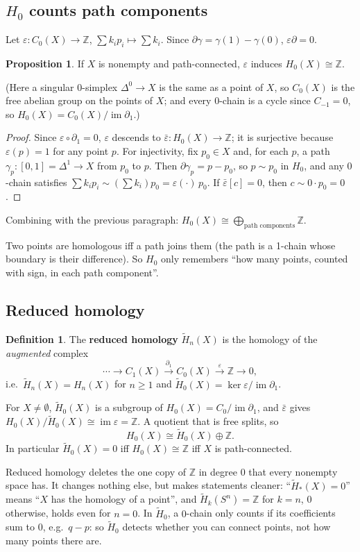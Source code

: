 \documentclass[11pt]{article}
\newcommand{\Z}{\mathbb Z}
\newcommand{\im}{\operatorname{im}}
\newcommand{\Hred}{\tilde H}
\theoremstyle{definition}
\newtheorem{prop}[thm]{Proposition}
\newtheorem{defn}[thm]{Definition}
\begin{document}
\subsection{$H_0$ counts path components}
Let $\varepsilon:C_0(X)\to\Z$, $\sum k_ip_i\mapsto\sum k_i$. Since $\partial\gamma=\gamma(1)-\gamma(0)$, $\varepsilon\partial=0$.
\begin{prop}
If $X$ is nonempty and path-connected, $\varepsilon$ induces $H_0(X)\cong\Z$.
\end{prop}
(Here a singular $0$-simplex $\Delta^0\to X$ is the same as a point of $X$, so $C_0(X)$ is the free abelian group on the points of $X$; and every $0$-chain is a cycle since $C_{-1}=0$, so $H_0(X)=C_0(X)/\im\partial_1$.)
\begin{proof}
Since $\varepsilon\circ\partial_1=0$, $\varepsilon$ descends to $\bar\varepsilon:H_0(X)\to\Z$; it is surjective because $\varepsilon(p)=1$ for any point $p$. For injectivity, fix $p_0\in X$ and, for each $p$, a path $\gamma_p:[0,1]=\Delta^1\to X$ from $p_0$ to $p$. Then $\partial\gamma_p=p-p_0$, so $p\sim p_0$ in $H_0$, and any $0$-chain satisfies $\sum k_ip_i\sim(\sum k_i)p_0=\varepsilon(\cdot)\,p_0$. If $\bar\varepsilon[c]=0$, then $c\sim0\cdot p_0=0$.
\end{proof}
Combining with the previous paragraph: $H_0(X)\cong\bigoplus_{\text{path components}}\Z$.
\begin{intuition}
Two points are homologous iff a path joins them (the path is a 1-chain whose boundary is their difference). So $H_0$ only remembers ``how many points, counted with sign, in each path component''.
\end{intuition}

\subsection{Reduced homology}
\begin{defn}
The \textbf{reduced homology} $\Hred_n(X)$ is the homology of the \emph{augmented} complex
\[\cdots\to C_1(X)\xrightarrow{\partial_1}C_0(X)\xrightarrow{\varepsilon}\Z\to0,\]
i.e.\ $\Hred_n(X)=H_n(X)$ for $n\ge1$ and $\Hred_0(X)=\ker\varepsilon/\im\partial_1$.
\end{defn}
For $X\neq\emptyset$, $\Hred_0(X)$ is a subgroup of $H_0(X)=C_0/\im\partial_1$, and $\bar\varepsilon$ gives $H_0(X)/\Hred_0(X)\cong\im\varepsilon=\Z$. A quotient that is free splits, so
\[H_0(X)\cong\Hred_0(X)\oplus\Z.\]
In particular $\Hred_0(X)=0$ iff $H_0(X)\cong\Z$ iff $X$ is path-connected.
\begin{intuition}
Reduced homology deletes the one copy of $\Z$ in degree $0$ that every nonempty space has. It changes nothing else, but makes statements cleaner: ``$\Hred_*(X)=0$'' means ``$X$ has the homology of a point'', and $\Hred_k(S^n)=\Z$ for $k=n$, $0$ otherwise, holds even for $n=0$. In $\Hred_0$, a $0$-chain only counts if its coefficients sum to $0$, e.g.\ $q-p$: so $\Hred_0$ detects whether you can connect points, not how many points there are.
\end{intuition}
\end{document}
